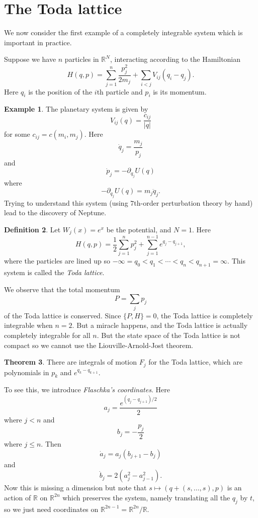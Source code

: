 \documentclass[12pt]{report}
\newcommand{\RR}{\mathbb{R}}
\newcommand{\dfn}[1]{\emph{#1}\index{#1}}
\theoremstyle{definition}
\newtheorem{theorem}{Theorem}[chapter]
\newtheorem{definition}[theorem]{Definition}
\newtheorem{example}[theorem]{Example}
\begin{document}
\section{The Toda lattice}
We now consider the first example of a completely integrable system which is important in practice.

Suppose we have $n$ particles in $\RR^N$, interacting according to the Hamiltonian
$$H(q, p) = \sum_{j=1}^n \frac{p_j^2}{2m_j} + \sum_{i<j} V_{ij}(q_i - q_j).$$
Here $q_i$ is the position of the $i$th particle and $p_i$ is its momentum.

\begin{example}
The planetary system is given by
$$V_{ij}(q) = \frac{c_{ij}}{|q|}$$
for some $c_{ij} = c(m_i, m_j)$.
Here
$$\dot q_j = \frac{m_j}{p_j}$$
and
$$\dot p_j = -\partial_{q_j} U(q)$$
where
$$-\partial_{q_j} U(q) = m_j\ddot q_j.$$
Trying to understand this system (using $7$th-order perturbation theory by hand) lead to the discovery of Neptune.
\end{example}

\begin{definition}
Let $W_j(x) = e^x$ be the potential, and $N = 1$. Here
$$H(q, p) = \frac{1}{2} \sum_{j=1}^n p_j^2 + \sum_{j=1}^{n-1} e^{q_j - q_{j+1}},$$
where the particles are lined up so $-\infty = q_0 < q_1 < \cdots < q_n < q_{n+1} = \infty$.
This system is called the \dfn{Toda lattice}.
\end{definition}
We observe that the total momentum
$$P = \sum_j p_j$$
of the Toda lattice is conserved. Since $\{P, H\} = 0$, the Toda lattice is completely integrable when $n = 2$. But a miracle happens, and the Toda lattice is actually completely integrable for all $n$.
But the state space of the Toda lattice is not compact so we cannot use the Liouville-Arnold-Jost theorem.
\begin{theorem}
There are integrals of motion $F_j$ for the Toda lattice, which are polynomials in $p_k$ and $e^{q_k - q_{k+1}}$.
\end{theorem}
To see this, we introduce \dfn{Flaschka's coordinates}. Here
$$a_j = \frac{e^{(q_j-q_{j+1})/2}}{2}$$
where $j < n$ and
$$b_j = -\frac{p_j}{2}$$
where $j \leq n$. Then
$$\dot a_j = a_j(b_{j+1} - b_j)$$
and
$$\dot b_j = 2(a_j^2 - a_{j-1}^2).$$
Now this is missing a dimension but note that $s \mapsto (q + (s, \dots, s), p)$ is an action of $\RR$ on $\RR^{2n}$ which preserves the system,
namely translating all the $q_j$ by $t$, so we just need coordinates on $\RR^{2n-1} = \RR^{2n}/\RR$.
\end{document}
